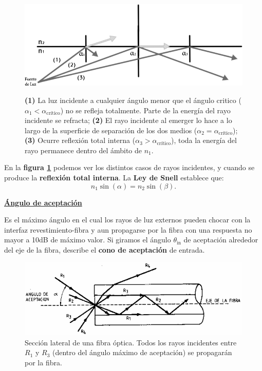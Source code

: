 \documentclass[10pt,a4paper]{article}
\begin{document}
\begin{figure}[ht!]
  \caption{\textbf{(1)} La luz incidente a cualquier ángulo menor que el ángulo critico ($\alpha_1 < \alpha_\text{crítico}$) no se refleja totalmente. Parte de la energía del rayo incidente se refracta; \textbf{(2)} El rayo incidente al emerger lo hace a lo largo de la superficie de separación de los dos medios ($\alpha_2 = \alpha_\text{crítico}$); \textbf{(3)} Ocurre reflexión total interna ($\alpha_3 > \alpha_\text{crítico}$), toda la energía del rayo permanece dentro del ámbito de $n_1$.}
  \label{fig:snell}  
  \centering
  \hbox{
	\includegraphics[width=\textwidth-\fboxrule-\fboxrule]{imgs/snell.png}}
\end{figure}

En la \textbf{figura \ref{fig:snell}} podemos ver los distintos casos de rayos incidentes, y cuando se produce la \textbf{reflexión total interna}. La \textbf{Ley de Snell} establece que: 
\[n_1 \sin(\alpha)=n_2 \sin(\beta).\]

\underline{\textbf{Ángulo de aceptación}}

Es el máximo ángulo en el cual los rayos de luz externos pueden chocar con la interfaz revestimiento-fibra y aun propagarse por la fibra con una respuesta no mayor a 10dB de máximo valor. Si giramos el ángulo $\theta_\text{in}$ de aceptación alrededor del eje de la fibra, describe el \textbf{cono de aceptación} de entrada.

\begin{figure}[ht!]
  \caption{Sección lateral de una fibra óptica. Todos los rayos incidentes entre $R_1$ y $R_3$ (dentro del ángulo máximo de aceptación) se propagarán por la fibra.}
  \label{fig:angulo_aceptacion}  
  \centerline{
	\includegraphics[width=0.9\textwidth-\fboxrule-\fboxrule]{imgs/angulo_aceptacion.png}}
\end{figure}
\end{document}

